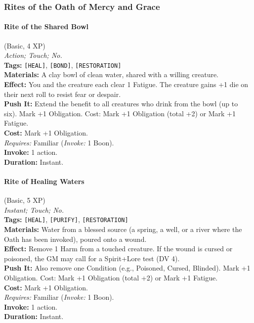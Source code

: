 \subsubsection*{Rites of the Oath of Mercy and Grace}

\paragraph{Rite of the Shared Bowl} (Basic, 4 XP) \hfill \\
\emph{Action; Touch; No.} \\
\textbf{Tags:} \texttt{[HEAL]}, \texttt{[BOND]}, \texttt{[RESTORATION]} \\
\textbf{Materials:} A clay bowl of clean water, shared with a willing creature. \\
\textbf{Effect:} You and the creature each clear 1 Fatigue. The creature gains +1 die on their next roll to resist fear or despair. \\
\textbf{Push It:} Extend the benefit to all creatures who drink from the bowl (up to six). Mark +1 Obligation. Cost: Mark +1 Obligation (total +2) or Mark +1 Fatigue. \\
\textbf{Cost:} Mark +1 Obligation. \\
\textit{Requires:} Familiar (\textit{Invoke:} 1 Boon). \\
\textbf{Invoke:} 1 action. \\
\textbf{Duration:} Instant.

\paragraph{Rite of Healing Waters} (Basic, 5 XP) \hfill \\
\emph{Instant; Touch; No.} \\
\textbf{Tags:} \texttt{[HEAL]}, \texttt{[PURIFY]}, \texttt{[RESTORATION]} \\
\textbf{Materials:} Water from a blessed source (a spring, a well, or a river where the Oath has been invoked), poured onto a wound. \\
\textbf{Effect:} Remove 1 Harm from a touched creature. If the wound is cursed or poisoned, the GM may call for a Spirit+Lore test (DV 4). \\
\textbf{Push It:} Also remove one Condition (e.g., Poisoned, Cursed, Blinded). Mark +1 Obligation. Cost: Mark +1 Obligation (total +2) or Mark +1 Fatigue. \\
\textbf{Cost:} Mark +1 Obligation. \\
\textit{Requires:} Familiar (\textit{Invoke:} 1 Boon). \\
\textbf{Invoke:} 1 action. \\
\textbf{Duration:} Instant.

